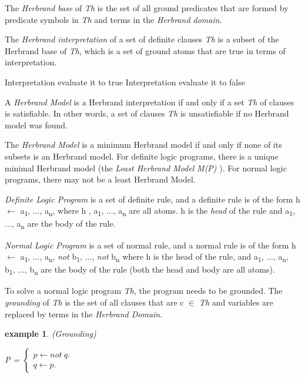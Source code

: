 \documentclass[12pt,twoside]{report}
\newtheorem{examp}{example}[section]
\begin{document}
The \textit{Herbrand base} of \textit{Th} is the set of all ground predicates that are formed by predicate symbols in \textit{Th} and terms in the \textit{Herbrand domain}.

The \textit{Herbrand interpretation} of a set of definite clauses \textit{Th} is a subset of the Herbrand base of \textit{Th}, which is a set of ground atoms that are true in terms of interpretation.

Interpretation evaluate it to true
Interpretation evaluate it to false

A \textit{Herbrand Model} is a Herbrand interpretation if and only if a set \textit{Th} of clauses is satisfiable. In other words, a set of clauses \textit{Th} is unsatisfiable if no Herbrand model was found.

The \textit{Herbrand Model} is a minimum Herbrand model if and only if none of its subsets is an Herbrand model.
For definite logic programs, there is a unique minimal Herbrand model (the \textit{Least Herbrand Model} \textit{M(P)} ).
For normal logic programs, there may not be a least Herbrand Model.

\textit{Definite Logic Program} is a set of definite rule, and  a definite rule is of the form h $\leftarrow$ a\textsubscript{1}, ..., a\textsubscript{n}, where h , a\textsubscript{1}, ..., a\textsubscript{n} are all atoms. h is the \textit{head} of the rule and a\textsubscript{1}, ..., a\textsubscript{n} are the body of the rule.

\textit{Normal Logic Program} is a set of normal rule, and a normal rule is of the form h $\leftarrow$ a\textsubscript{1}, ..., a\textsubscript{n}, \textit{not} b\textsubscript{1}, ..., \textit{not}  b\textsubscript{n} where h is the head of the rule,
 and a\textsubscript{1}, ..., a\textsubscript{n}, b\textsubscript{1}, ..., b\textsubscript{n} are the body of the rule (both the head and body are all atoms).

To solve a normal logic program \textit{Th}, the program needs to be grounded. The \textit{grounding} of \textit{Th} is the set of all clauses that are c $\in$ \textit{Th} and variables are replaced by terms in the \textit{Herbrand Domain}.

\begin{examp} \normalfont (Grounding)

P = $\begin{cases}
	p  \leftarrow not \ q. \\
	q  \leftarrow p.
      \end{cases}$
\end{examp}
\label{grounding}
\end{document}
